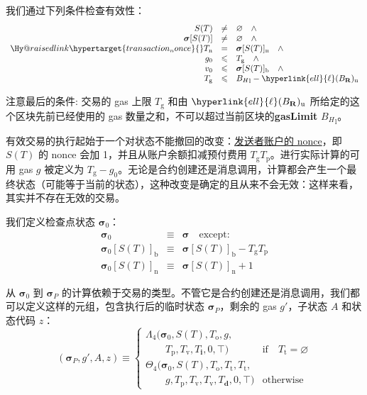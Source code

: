 \documentclass[9pt,oneside]{amsart}
\makeatletter
\newcommand{\linkdest}[1]{\Hy@raisedlink{\hypertarget{#1}{}}}
\makeatother
\begin{document}
\begin{multicols}{2}
我们通过下列条件检查有效性：
\begin{equation}
\begin{array}[t]{rcl}
S(T) & \neq & \varnothing \quad \wedge \\
\boldsymbol{\sigma}[S(T)] & \neq & \varnothing \quad \wedge \\
\linkdest{transaction_nonce}{}T_{\mathrm{n}} & = & \boldsymbol{\sigma}[S(T)]_{\mathrm{n}} \quad \wedge \\
g_0 & \leqslant & T_{\mathrm{g}} \quad \wedge \\
v_0 & \leqslant & \boldsymbol{\sigma}[S(T)]_{\mathrm{b}} \quad \wedge \\
T_{\mathrm{g}} & \leqslant & {B_{H}}_{\mathrm{l}} - \hyperlink{ell}{\ell}(B_{\mathbf{R}})_{\mathrm{u}}
\end{array}
\end{equation}

注意最后的条件: 交易的 gas 上限 $T_{\mathrm{g}}$ 和由 $\hyperlink{ell}{\ell}(B_{\mathbf{R}})_{\mathrm{u}}$ 所给定的这个区块先前已经使用的 gas 数量之和，不可以超过当前区块的\textbf{gasLimit} ${B_{H}}_{\mathrm{l}}$。

有效交易的执行起始于一个对状态不能撤回的改变：\hyperlink{account_nonce}{发送者账户的 nonce}，即 $S(T)$ 的 nonce 会加 1，并且从账户余额扣减预付费用 $T_{\mathrm{g}}T_{\mathrm{p}}$。进行实际计算的可用 gas $g$ 被定义为 $T_{\mathrm{g}} - g_0$。无论是合约创建还是消息调用，计算都会产生一个最终状态（可能等于当前的状态），这种改变是确定的且从来不会无效：这样来看，其实并不存在无效的交易。

我们定义检查点状态 $\boldsymbol{\sigma}_0$：
\begin{eqnarray}
\boldsymbol{\sigma}_0 & \equiv & \boldsymbol{\sigma} \quad \text{except:} \\
\boldsymbol{\sigma}_0[S(T)]_{\mathrm{b}} & \equiv & \boldsymbol{\sigma}[S(T)]_{\mathrm{b}} - T_{\mathrm{g}} T_{\mathrm{p}} \\
\boldsymbol{\sigma}_0[S(T)]_{\mathrm{n}} & \equiv & \boldsymbol{\sigma}[S(T)]_{\mathrm{n}} + 1
\end{eqnarray}

从 $\boldsymbol{\sigma}_0$ 到 $\boldsymbol{\sigma}_{P}$ 的计算依赖于交易的类型。不管它是合约创建还是消息调用，我们都可以定义这样的元组，包含执行后的临时状态 $\boldsymbol{\sigma}_{P}$，剩余的 gas $g'$，子状态 $A$ 和状态代码 $z$：
\begin{equation}
(\boldsymbol{\sigma}_{P}, g', A, z) \equiv \begin{cases}
\Lambda_{4}(\boldsymbol{\sigma}_0, S(T), T_{\mathrm{o}}, g, &\\ \quad\quad T_{\mathrm{p}}, T_{\mathrm{v}}, T_{\mathbf{i}}, 0, \top) & \text{if} \quad T_{\mathrm{t}} = \varnothing \\
\Theta_{4}(\boldsymbol{\sigma}_0, S(T), T_{\mathrm{o}}, T_{\mathrm{t}}, T_{\mathrm{t}}, &\\ \quad\quad g, T_{\mathrm{p}}, T_{\mathrm{v}}, T_{\mathrm{v}}, T_{\mathbf{d}}, 0, \top) & \text{otherwise}
\end{cases}
\end{equation}


\end{multicols}
\end{document}
